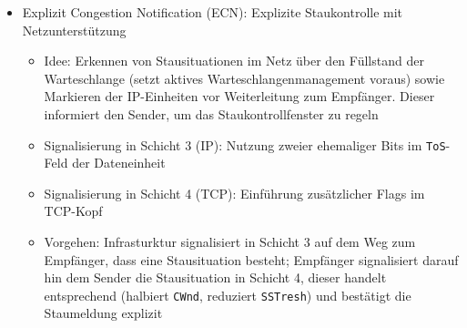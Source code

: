 \begin{itemize}
\begin{itemize}
\begin{enumerate}
\begin{itemize}
\begin{itemize}
				\end{itemize}
			\end{itemize}
		\end{enumerate}
		\item Explizit Congestion Notification (ECN): Explizite Staukontrolle mit Netzunterstützung
		\begin{itemize}
			\item Idee: Erkennen von Stausituationen im Netz über den Füllstand der Warteschlange (setzt aktives Warteschlangenmanagement voraus) sowie Markieren der IP-Einheiten vor Weiterleitung zum Empfänger. Dieser informiert den Sender, um das Staukontrollfenster zu regeln
			\item Signalisierung in Schicht 3 (IP): Nutzung zweier ehemaliger Bits im \texttt{ToS}-Feld der Dateneinheit
			\item Signalisierung in Schicht 4 (TCP): Einführung zusätzlicher Flags im TCP-Kopf
			\item Vorgehen: Infrasturktur signalisiert in Schicht 3 auf dem Weg zum Empfänger, dass eine Stausituation besteht; Empfänger signalisiert darauf hin dem Sender die Stausituation in Schicht 4, dieser handelt entsprechend (halbiert \texttt{CWnd}, reduziert \texttt{SSTresh}) und bestätigt die Staumeldung explizit
		\end{itemize}
	\end{itemize}
\end{itemize}

